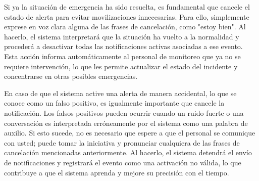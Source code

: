 Si ya la situación de emergencia ha sido resuelta, es fundamental que cancele el estado de alerta para evitar movilizaciones innecesarias. Para ello, simplemente exprese en voz clara alguna de las frases de cancelación, como "estoy bien". Al hacerlo, el sistema interpretará que la situación ha vuelto a la normalidad y procederá a desactivar todas las notificaciones activas asociadas a ese evento. Esta acción informa automáticamente al personal de monitoreo que ya no se requiere intervención, lo que les permite actualizar el estado del incidente y concentrarse en otras posibles emergencias.

En caso de que el sistema active una alerta de manera accidental, lo que se conoce como un falso positivo, es igualmente importante que cancele la notificación. Los falsos positivos pueden ocurrir cuando un ruido fuerte o una conversación es interpretada erróneamente por el sistema como una palabra de auxilio. Si esto sucede, no es necesario que espere a que el personal se comunique con usted; puede tomar la iniciativa y pronunciar cualquiera de las frases de cancelación mencionadas anteriormente. Al hacerlo, el sistema detendrá el envío de notificaciones y registrará el evento como una activación no válida, lo que contribuye a que el sistema aprenda y mejore su precisión con el tiempo.
